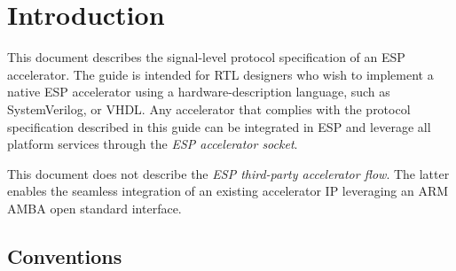\chapter{Introduction}

This document describes the signal-level protocol specification of an ESP
accelerator. The guide is intended for RTL designers who wish to implement a
native ESP accelerator using a hardware-description language, such as
SystemVerilog, or VHDL. Any accelerator that complies with the protocol
specification described in this guide can be integrated in ESP and leverage all
platform services through the {\em ESP accelerator socket}.

This document does not describe the {\em ESP third-party accelerator flow}. The
latter enables the seamless integration of an existing accelerator IP leveraging
an ARM AMBA open standard interface.

\section{Conventions}

